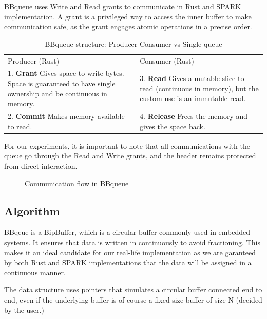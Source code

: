 \documentclass[nomenclature, english, bibtex]{kththesis}
\begin{document}
BBqueue uses Write and Read grants to communicate in Rust and SPARK implementation. A grant is a
privileged way to access the inner buffer to make communication safe, as the grant engages atomic operations in a precise order. 

\begin{table}[ht!]
\footnotesize
\centering
\caption{BBqueue structure: Producer-Consumer vs Single queue}
\label{tab:bbqueue}
\begin{tabular}{ |m{5cm}|m{5cm}| }
\hline
\rowcolor{color1bg!20}
\multicolumn{2}{|c|}{BBQueue (SPARK)} \\
\hline
\rowcolor{color1bg!20}
\centering Producer (Rust) & \centering Consumer (Rust) \tabularnewline
\hline
1. \textbf{Grant} \newline Gives space to write bytes. Space is guaranteed to have single ownership and be continuous in memory. & 3. \textbf{Read} \newline Gives a mutable slice to read (continuous in memory), but the custom use is an immutable read. \tabularnewline
\hline
2. \textbf{Commit} \newline Makes memory available to read. & 4. \textbf{Release} \newline Frees the memory and gives the space back. \tabularnewline
\hline
\end{tabular}
\end{table}
\FloatBarrier
For our experiments, it is important to note that all communications with the queue go through the Read and Write grants, and the header remains protected from direct interaction. 

\begin{figure}[ht!]
  \centering 

\caption{Communication flow in BBqueue}
\end{figure}
\FloatBarrier

\subsection{Algorithm}

BBqeue is a BipBuffer, which is a circular buffer commonly used in embedded systems. It ensures that data is written in continuously to avoid fractioning. This makes it an ideal candidate for our real-life implementation as we are garanteed by both Rust and SPARK implementations that the data will be assigned in a continuous manner.

The data structure uses pointers that simulates a circular buffer connected end to end, even if the underlying buffer is of course a fixed size buffer of size N (decided by the user.)  
\end{document}
